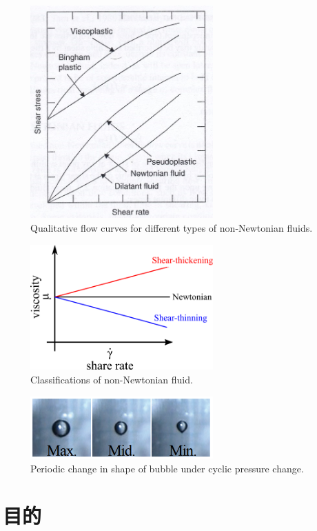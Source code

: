 \begin{center}
    \begin{figure}[h]
        \centering
        \includegraphics[width=7.0cm,clip]{1-Background/1-fluid-curve.jpg}
        \caption{Qualitative flow curves for different types of non-Newtonian fluids\cite{ref:1}.}
        \label{fig:1-fluid-curve}
    \end{figure}

    \begin{figure}[h]
        \centering
        \includegraphics[width=7.0cm,clip]{1-Background/2-Newton-fluid.png}
        \caption{Classifications of non-Newtonian fluid.}
        \label{fig:2-Newton-fluid}
    \end{figure}

    \begin{figure}[h]
        \centering
        \includegraphics[width=7.0cm,clip]{1-Background/3-bubble.png}
        \caption{Periodic change in shape of bubble under cyclic pressure change\cite{ref:5}.}
        \label{fig:3-bubble}
    \end{figure}
\end{center}

\section{目的}
